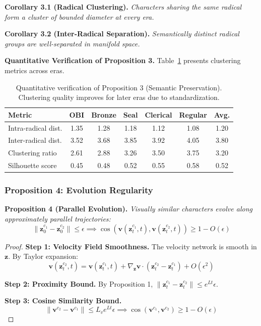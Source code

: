 \documentclass{article}
\begin{document}
\textbf{Corollary 3.1 (Radical Clustering).} \textit{Characters sharing the same radical form a cluster of bounded diameter at every era.}

\textbf{Corollary 3.2 (Inter-Radical Separation).} \textit{Semantically distinct radical groups are well-separated in manifold space.}

\textbf{Quantitative Verification of Proposition 3.} Table~\ref{tab:prop3_verify} presents clustering metrics across eras.

\begin{table}[h]
\centering
\caption{Quantitative verification of Proposition 3 (Semantic Preservation). Clustering quality improves for later eras due to standardization.}
\label{tab:prop3_verify}
\begin{tabular}{lcccccc}
\toprule
\textbf{Metric} & \textbf{OBI} & \textbf{Bronze} & \textbf{Seal} & \textbf{Clerical} & \textbf{Regular} & \textbf{Avg.} \\
\midrule
Intra-radical dist. & 1.35 & 1.28 & 1.18 & 1.12 & 1.08 & 1.20 \\
Inter-radical dist. & 3.52 & 3.68 & 3.85 & 3.92 & 4.05 & 3.80 \\
Clustering ratio & 2.61 & 2.88 & 3.26 & 3.50 & 3.75 & 3.20 \\
Silhouette score & 0.45 & 0.48 & 0.52 & 0.55 & 0.58 & 0.52 \\
\bottomrule
\end{tabular}
\end{table}

\subsubsection{Proposition 4: Evolution Regularity}

\textbf{Proposition 4 (Parallel Evolution).} \textit{Visually similar characters evolve along approximately parallel trajectories:}
\begin{equation}
\|\mathbf{z}_0^{c_1} - \mathbf{z}_0^{c_2}\| \leq \epsilon \implies \cos(\mathbf{v}(\mathbf{z}_t^{c_1}, t), \mathbf{v}(\mathbf{z}_t^{c_2}, t)) \geq 1 - O(\epsilon)
\end{equation}

\begin{proof}
\textbf{Step 1: Velocity Field Smoothness.} The velocity network is smooth in $\mathbf{z}$. By Taylor expansion:
\begin{equation}
\mathbf{v}(\mathbf{z}_t^{c_2}, t) = \mathbf{v}(\mathbf{z}_t^{c_1}, t) + \nabla_{\mathbf{z}} \mathbf{v} \cdot (\mathbf{z}_t^{c_2} - \mathbf{z}_t^{c_1}) + O(\epsilon^2)
\end{equation}

\textbf{Step 2: Proximity Bound.} By Proposition 1, $\|\mathbf{z}_t^{c_1} - \mathbf{z}_t^{c_2}\| \leq e^{Lt} \epsilon$.

\textbf{Step 3: Cosine Similarity Bound.}
\begin{equation}
\|\mathbf{v}^{c_2} - \mathbf{v}^{c_1}\| \leq L_v e^{Lt} \epsilon \implies \cos(\mathbf{v}^{c_1}, \mathbf{v}^{c_2}) \geq 1 - O(\epsilon)
\end{equation}
\end{proof}
\end{document}

